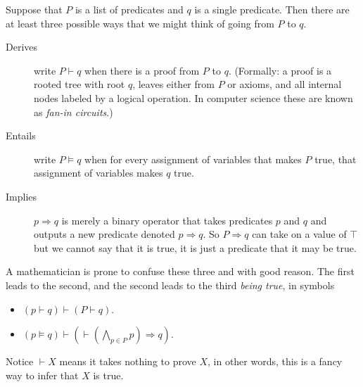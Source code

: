 Suppose that $P$ is a list of predicates 
and $q$ is a single predicate.  Then there are at least three possible 
ways that we might think of going from $P$ to $q$.
\begin{description}
    \item[Derives] write $P\vdash q$ when there is a proof from $P$ to $q$.
    (Formally: a proof is a rooted tree with root $q$, leaves either from $P$ or axioms, 
    and all internal nodes labeled by a logical operation.  In computer science 
    these are known as \emph{fan-in circuits}.)
    
    \item[Entails] write $P\vDash q$ when for every assignment of variables that makes 
    $P$ true, that assignment of variables makes $q$ true.

    \item[Implies] $p\Rightarrow q$ is merely a binary operator that takes
    predicates $p$ and $q$ and outputs a new predicate denoted $p\Rightarrow q$.
    So $P\Rightarrow q$ can take on a value of $\top$ but we cannot say 
    that it is true, it is just a predicate that it may be true.
\end{description}
A mathematician is prone to confuse these three and with good reason.
The first leads to the second, and the second leads to the third \emph{being true},
in symbols
\begin{itemize}
    \item $(p\vdash q)\vdash (P\vdash q)$.
    \item $\displaystyle (p\vDash q)\vdash \left(\vdash \left(\bigwedge_{p\in P} p\right) \Rightarrow q\right)$.
\end{itemize}
Notice $\vdash X$ means it takes nothing to prove $X$, in other words,
this is a fancy way to infer that $X$ is true.  

